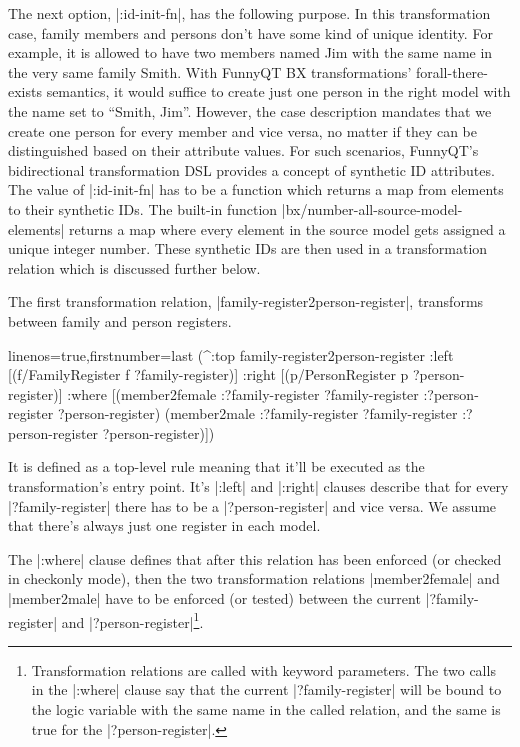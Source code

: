 \documentclass[a4paper]{article}
\newcommand{\code}{\clojureinline}
\begin{document}
The next option, \code|:id-init-fn|, has the following purpose.  In this
transformation case, family members and persons don't have some kind of unique
identity.  For example, it is allowed to have two members named Jim with the
same name in the very same family Smith.  With FunnyQT BX transformations'
forall-there-exists semantics, it would suffice to create just one person in
the right model with the name set to ``Smith, Jim''.  However, the case
description mandates that we create one person for every member and vice versa,
no matter if they can be distinguished based on their attribute values.  For
such scenarios, FunnyQT's bidirectional transformation DSL provides a concept
of synthetic ID attributes.  The value of \code|:id-init-fn| has to be a
function which returns a map from elements to their synthetic IDs.  The
built-in function \code|bx/number-all-source-model-elements| returns a map
where every element in the source model gets assigned a unique integer number.
These synthetic IDs are then used in a transformation relation which is
discussed further below.

The first transformation relation, \code|family-register2person-register|,
transforms between family and person registers.

\begin{clojurecode*}{linenos=true,firstnumber=last}
  (^:top family-register2person-register
   :left  [(f/FamilyRegister f ?family-register)]
   :right [(p/PersonRegister p ?person-register)]
   :where [(member2female :?family-register ?family-register :?person-register ?person-register)
           (member2male :?family-register ?family-register :?person-register ?person-register)])
\end{clojurecode*}

It is defined as a top-level rule meaning that it'll be executed as the
transformation's entry point.  It's \code|:left| and \code|:right| clauses
describe that for every \code|?family-register| there has to be a
\code|?person-register| and vice versa.  We assume that there's always just one
register in each model.

The \code|:where| clause defines that after this relation has been enforced (or
checked in checkonly mode), then the two transformation relations
\code|member2female| and \code|member2male| have to be enforced (or tested)
between the current \code|?family-register| and
\code|?person-register|\footnote{Transformation relations are called with
  keyword parameters.  The two calls in the \code|:where| clause say that the
  current \code|?family-register| will be bound to the logic variable with the
  same name in the called relation, and the same is true for the
  \code|?person-register|.}.
\end{document}
